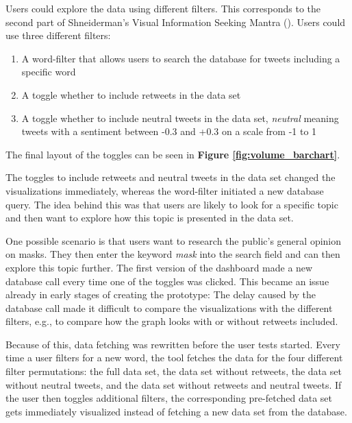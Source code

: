 Users could explore the data using different filters. This corresponds to the second part of Shneiderman's Visual Information Seeking Mantra  (\cite[337]{shneidermanEyesHaveIt1996}). Users could use three different filters:

\begin{enumerate}
    \item A word-filter that allows users to search the database for tweets including a specific word
    \item A toggle whether to include retweets in the data set
    \item A toggle whether to include neutral tweets in the data set, \emph{neutral} meaning tweets with a sentiment between -0.3 and +0.3 on a scale from -1 to 1 %
\end{enumerate}

The final layout of the toggles can be seen in \textbf{Figure \ref{fig:volume_barchart}}.

The toggles to include retweets and neutral tweets in the data set changed the visualizations immediately, whereas the word-filter initiated a new database query. The idea behind this was that users are likely to look for a specific topic and then want to explore how this topic is presented in the data set.

One possible scenario is that users want to research the public's general opinion on masks. They then enter the keyword \emph{mask} into the search field and can then explore this topic further. The first version of the dashboard made a new database call every time one of the toggles was clicked. This became an issue already in early stages of creating the prototype: The delay caused by the database call made it difficult to compare the visualizations with the different filters, e.g., to compare how the graph looks with or without retweets included.

Because of this, data fetching was rewritten before the user tests started. Every time a user filters for a new word, the tool fetches the data for the four different filter permutations: the full data set, the data set without retweets, the data set without neutral tweets, and the data set without retweets and neutral tweets. If the user then toggles additional filters, the corresponding pre-fetched data set gets immediately visualized instead of fetching a new data set from the database.

